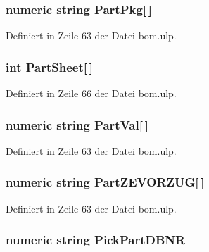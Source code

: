 \subsubsection[{Part\+Pkg}]{\setlength{\rightskip}{0pt plus 5cm}numeric string Part\+Pkg\mbox{[}$\,$\mbox{]}}\label{bom_8ulp_ab38dccbbc14320a5df859acfea65a3e6}


Definiert in Zeile 63 der Datei bom.\+ulp.

\hypertarget{bom_8ulp_aae665133b57441f92f2da44703a9ea57}{}
\subsubsection[{Part\+Sheet}]{\setlength{\rightskip}{0pt plus 5cm}int Part\+Sheet\mbox{[}$\,$\mbox{]}}\label{bom_8ulp_aae665133b57441f92f2da44703a9ea57}


Definiert in Zeile 66 der Datei bom.\+ulp.

\hypertarget{bom_8ulp_aa0f0748df59ef1a5e748ba8b0f41d3cd}{}
\subsubsection[{Part\+Val}]{\setlength{\rightskip}{0pt plus 5cm}numeric string Part\+Val\mbox{[}$\,$\mbox{]}}\label{bom_8ulp_aa0f0748df59ef1a5e748ba8b0f41d3cd}


Definiert in Zeile 63 der Datei bom.\+ulp.

\hypertarget{bom_8ulp_a6076bc5f468469ec6838abe6933cb125}{}
\subsubsection[{Part\+Z\+E\+V\+O\+R\+Z\+U\+G}]{\setlength{\rightskip}{0pt plus 5cm}numeric string Part\+Z\+E\+V\+O\+R\+Z\+U\+G\mbox{[}$\,$\mbox{]}}\label{bom_8ulp_a6076bc5f468469ec6838abe6933cb125}


Definiert in Zeile 63 der Datei bom.\+ulp.

\hypertarget{bom_8ulp_ad06c90d84f184524f9d3746de4c1cc2a}{}
\subsubsection[{Pick\+Part\+D\+B\+N\+R}]{\setlength{\rightskip}{0pt plus 5cm}numeric string Pick\+Part\+D\+B\+N\+R}\label{bom_8ulp_ad06c90d84f184524f9d3746de4c1cc2a}


